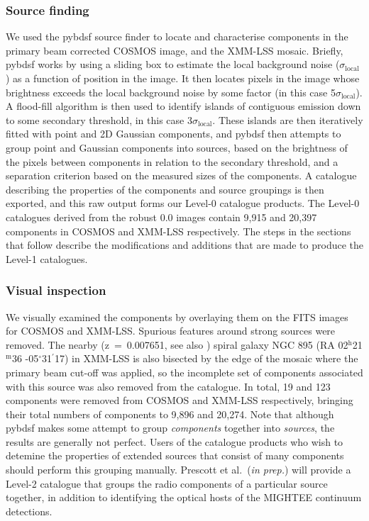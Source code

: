\documentclass[usenatbib,usedcolumn]{mnras}
\newcommand{\hhh}{$^{\mathrm{h}}$}
\newcommand{\mmm}{$^{\mathrm{m}}$}
\newcommand{\ddd}{$^{\mathrm{\circ}}$}
\newcommand{\dmm}{$^{\prime}$}
\begin{document}
\subsubsection{Source finding}
\label{sec:source_finding}

We used the {\sc pybdsf} source finder \citep{mohan2015} to locate and characterise components in the primary beam corrected COSMOS image, and the XMM-LSS mosaic. Briefly, {\sc pybdsf} works by using a sliding box to estimate the local background noise ($\sigma_{\mathrm{local}}$) as a function of position in the image. It then locates pixels in the image whose brightness exceeds the local background noise by some factor (in this case 5$\sigma_{\mathrm{local}}$). A flood-fill algorithm is then used to identify islands of contiguous emission down to some secondary threshold, in this case 3$\sigma_{\mathrm{local}}$. These islands are then iteratively fitted with point and 2D Gaussian components, and {\sc pybdsf} then attempts to group point and Gaussian components into sources, based on the brightness of the pixels between components in relation to the secondary threshold, and a separation criterion based on the measured sizes of the components. A catalogue describing the properties of the components and source groupings is then exported, and this raw output forms our Level-0 catalogue products. The Level-0 catalogues derived from the robust 0.0 images contain 9,915 and 20,397 components in COSMOS and XMM-LSS respectively. The steps in the sections that follow describe the modifications and additions that are made to produce the Level-1 catalogues.

\subsubsection{Visual inspection}

We visually examined the components by overlaying them on the FITS images for COSMOS and XMM-LSS. Spurious features around strong sources were removed. The nearby (z~=~0.007651, see also \citealt{maddox2021}) spiral galaxy NGC 895 (RA 02\hhh21\mmm36 -05\ddd31\dmm17) in XMM-LSS is also bisected by the edge of the mosaic where the primary beam cut-off was applied, so the incomplete set of components associated with this source was also removed from the catalogue. In total, 19 and 123 components were removed from COSMOS and XMM-LSS respectively, bringing their total numbers of components to 9,896 and 20,274. Note that although {\sc pybdsf} makes some attempt to group \emph{components} together into \emph{sources}, the results are generally not perfect. Users of the catalogue products who wish to detemine the properties of extended sources that consist of many components should perform this grouping manually. Prescott et al.~(\emph{in prep.}) will provide a Level-2 catalogue that groups the radio components of a particular source together, in addition to identifying the optical hosts of the MIGHTEE continuum detections.
\end{document}
